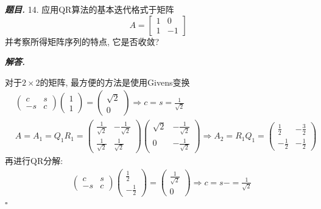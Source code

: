 \documentclass[10pt, a4paper, oneside]{ctexart}
\newenvironment{problem}{\begin{framed}\par\noindent\textbf{\textit{题目. }}}{\end{framed}\par}
\newenvironment{solution}{%
  \par\noindent\textbf{\textit{解答. }}\ignorespaces
}{%
  \hfill\ensuremath{\square}\par %
}
\begin{document}
\begin{problem}
14. 应用QR算法的基本迭代格式于矩阵
$$A=\begin{bmatrix}
    1&0\\1&-1
\end{bmatrix}$$ 
并考察所得矩阵序列的特点, 它是否收敛?  
\end{problem}
\begin{solution}
对于$2\times 2$的矩阵, 最方便的方法是使用Givens变换
\begin{align*}
    &\begin{pmatrix}
        c&s\\
        -s&c
    \end{pmatrix}\begin{pmatrix}
        1\\1
    \end{pmatrix}=\begin{pmatrix}
        \sqrt{2}\\0
    \end{pmatrix}\Rightarrow c=s=\frac{1}{\sqrt{2}}\\
    &A=A_1=Q_1R_1=\begin{pmatrix}
        \frac{1}{\sqrt{2}}&-\frac{1}{\sqrt{2}}\\
        \frac{1}{\sqrt{2}}&\frac{1}{\sqrt{2}}
    \end{pmatrix}\begin{pmatrix}
        \sqrt{2}&-\frac{1}{\sqrt{2}}\\
        0&-\frac{1}{\sqrt{2}}
    \end{pmatrix}\Rightarrow A_2=R_1Q_1=\begin{pmatrix}
        \frac{1}{2}&-\frac{3}{2}\\
        -\frac{1}{2}&-\frac{1}{2}
    \end{pmatrix}
\end{align*}
再进行QR分解:
\begin{align*}
    &\begin{pmatrix}
        c&s\\
        -s&c
    \end{pmatrix}\begin{pmatrix}
        \frac{1}{2}\\-\frac{1}{2}
    \end{pmatrix}=\begin{pmatrix}
        \frac{1}{\sqrt{2}}\\0
    \end{pmatrix}\Rightarrow c=s-=\frac{1}{\sqrt{2}}\\

\end{align*}
\end{solution}
\end{document}
